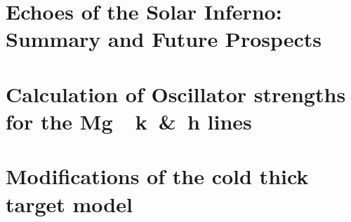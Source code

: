 \documentclass[plain]{hvdthesis}
\begin{document}
\chapter{Echoes of the Solar Inferno: Summary and Future Prospects}\label{c:chap8}

\clearpage
%
\appendix
\chapter{Calculation of Oscillator strengths for the Mg~~k~\&~h lines}\label{c:a1}

\clearpage

\chapter{Modifications of the cold thick target model}\label{c:a2}

\clearpage

\singlespace
%

\end{document}
